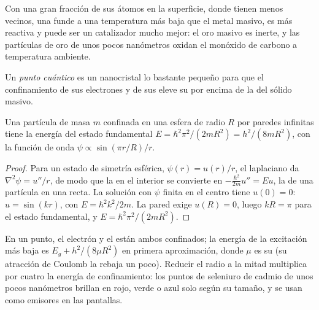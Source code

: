 Con una gran fracción de sus átomos en la superficie, donde tienen menos
vecinos, una  funde a una temperatura más baja que el metal masivo,
es más reactiva y puede ser un catalizador mucho mejor: el oro masivo es inerte, y las partículas
de oro de unos pocos nanómetros oxidan el monóxido de carbono a temperatura ambiente.

\begin{definition}\label{def:b3:inorganic-materials:quantum-dot}
Un \emph{punto cuántico} es un nanocristal  lo bastante
pequeño para que el confinamiento de sus electrones y de sus  eleve su 
por encima de la del sólido masivo.
\end{definition}

\begin{theorem}\label{thm:b3:inorganic-materials:quantum-dot}
Una partícula de masa $m$ confinada en una esfera de radio $R$ por paredes infinitas tiene
la energía del estado fundamental $E = \hbar^2\pi^2/(2mR^2) = h^2/(8mR^2)$, con la función de onda $\psi \propto \sin(\pi r/R)/r$.
\end{theorem}

\begin{proof}
Para un estado de simetría esférica, $\psi(r) = u(r)/r$, el laplaciano da
$\nabla^2\psi = u''/r$, de modo que la  en el interior se convierte en $-\frac{\hbar^2}{2m}u'' = Eu$, la de una partícula en una
recta. La solución con $\psi$ finita en el centro tiene $u(0) = 0$: $u = \sin(kr)$, con $E = \hbar^2k^2/2m$.
La pared exige $u(R) = 0$, luego $kR = \pi$ para el estado fundamental, y $E = \hbar^2\pi^2/(2mR^2)$.
\end{proof}

En un punto, el electrón y el  están ambos confinados; la energía de la
excitación más baja es $E_g + h^2/(8\mu R^2)$ en primera aproximación, donde $\mu$ es su  (su atracción de Coulomb la rebaja un poco). Reducir el radio a la mitad
multiplica por cuatro la energía de confinamiento: los puntos de seleniuro de cadmio de unos pocos
nanómetros brillan en rojo, verde o azul solo según su tamaño, y se usan como
emisores en las pantallas.

